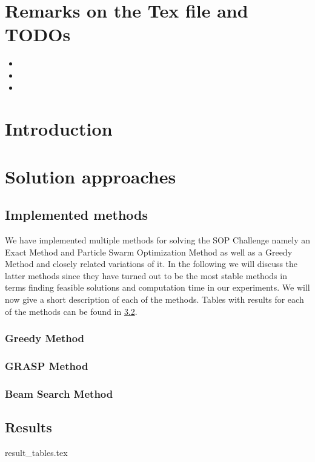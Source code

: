 \documentclass[]{article}
\begin{document}
    \maketitle
    \tableofcontents



    \section{Remarks on the Tex file and TODOs}

    \begin{itemize}
    	\item {}
    	\item {}
  		\item {}
    \end{itemize}

    \section{Introduction}

    

    \section{Solution approaches}

    \subsection{Implemented methods}

    We have implemented multiple methods for solving the SOP Challenge namely an Exact Method and Particle Swarm Optimization Method as well as a Greedy Method and closely related variations of it. In the following we will discuss the latter methods since they have turned out to be the most stable methods in terms finding feasible solutions and computation time in our experiments. We will now give a short description of each of the methods. Tables with results for each of the methods can be found in \ref{results}.

    \subsubsection{Greedy Method}


    \subsubsection{GRASP Method}


    \subsubsection{Beam Search Method}





    \subsection{Results}
    \label{results}


    {result_tables.tex}
\end{document}
